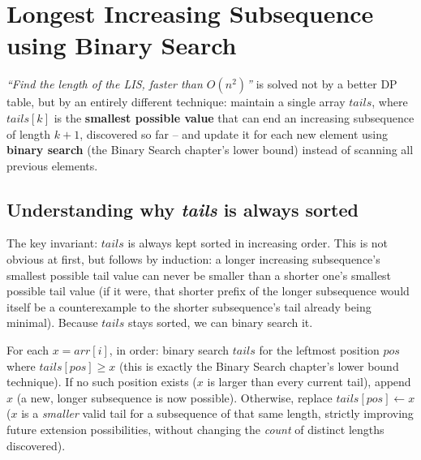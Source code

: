 \section{Longest Increasing Subsequence using Binary Search}
\label{sec:dp-lis-binary-search}


\begin{patternbox}
\emph{``Find the length of the LIS, faster than $O(n^2)$''} is solved
not by a better DP table, but by an entirely different technique:
maintain a single array $\textit{tails}$, where $\textit{tails}[k]$ is
the \textbf{smallest possible value} that can end an increasing
subsequence of length $k+1$, discovered so far -- and update it for
each new element using \textbf{binary search} (the Binary Search chapter's
lower bound) instead of scanning all previous elements.
\end{patternbox}

\subsection*{Understanding why \textit{tails} is always sorted}

The key invariant: $\textit{tails}$ is always kept sorted in increasing
order. This is not obvious at first, but follows by induction: a longer
increasing subsequence's smallest possible tail value can never be
smaller than a shorter one's smallest possible tail value (if it were,
that shorter prefix of the longer subsequence would itself be a
counterexample to the shorter subsequence's tail already being
minimal). Because $\textit{tails}$ stays sorted, we can binary search it.

\begin{ideabox}
For each $x = \textit{arr}[i]$, in order: binary search $\textit{tails}$
for the leftmost position $\textit{pos}$ where $\textit{tails}[\textit{pos}]
\ge x$ (this is exactly the Binary Search chapter's lower bound technique).
If no such position exists ($x$ is larger than every current tail),
append $x$ (a new, longer subsequence is now possible). Otherwise,
replace $\textit{tails}[\textit{pos}] \gets x$ ($x$ is a \emph{smaller}
valid tail for a subsequence of that same length, strictly improving
future extension possibilities, without changing the \emph{count} of
distinct lengths discovered).
\end{ideabox}

